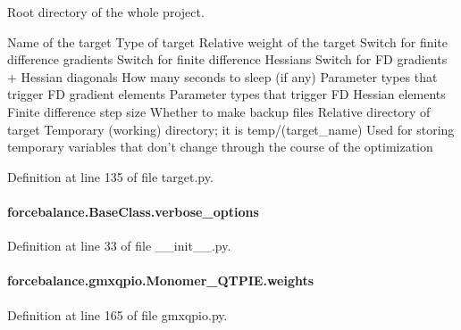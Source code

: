 Root directory of the whole project. 

Name of the target Type of target Relative weight of the target Switch for finite difference gradients Switch for finite difference Hessians Switch for F\-D gradients + Hessian diagonals How many seconds to sleep (if any) Parameter types that trigger F\-D gradient elements Parameter types that trigger F\-D Hessian elements Finite difference step size Whether to make backup files Relative directory of target Temporary (working) directory; it is temp/(target\-\_\-name) Used for storing temporary variables that don't change through the course of the optimization 

Definition at line 135 of file target.\-py.

\hypertarget{classforcebalance_1_1BaseClass_afd68efa29ccd2f320f4cf82198214aac}{
\paragraph[{verbose\-\_\-options}]{\setlength{\rightskip}{0pt plus 5cm}forcebalance.\-Base\-Class.\-verbose\-\_\-options\hspace{0.3cm}{\ttfamily [inherited]}}}\label{classforcebalance_1_1BaseClass_afd68efa29ccd2f320f4cf82198214aac}


Definition at line 33 of file \-\_\-\-\_\-init\-\_\-\-\_\-.\-py.

\hypertarget{classforcebalance_1_1gmxqpio_1_1Monomer__QTPIE_a4cbe02eccd28b60e657bbabc08ec25e0}{
\paragraph[{weights}]{\setlength{\rightskip}{0pt plus 5cm}forcebalance.\-gmxqpio.\-Monomer\-\_\-\-Q\-T\-P\-I\-E.\-weights}}\label{classforcebalance_1_1gmxqpio_1_1Monomer__QTPIE_a4cbe02eccd28b60e657bbabc08ec25e0}


Definition at line 165 of file gmxqpio.\-py.

